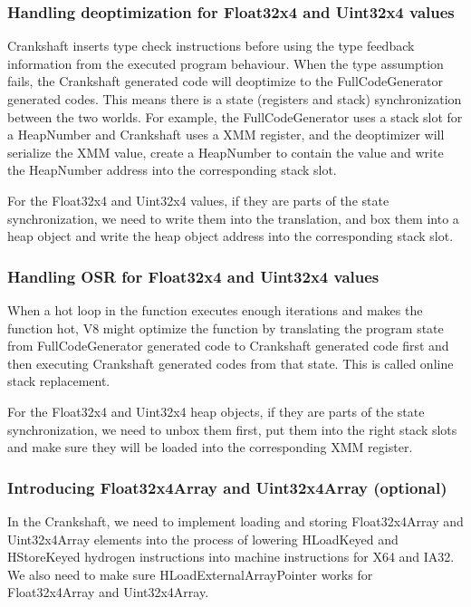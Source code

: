 \documentclass[12pt]{article} %
\begin{document}
\subsubsection{Handling deoptimization for Float32x4 and Uint32x4 values}
Crankshaft inserts type check instructions before using the type feedback
information from the executed program behaviour. When the type assumption
fails, the Crankshaft generated code will deoptimize to the FullCodeGenerator
generated codes. This means there is a state (registers and stack)
synchronization between the two worlds. For example, the FullCodeGenerator uses
a stack slot for a HeapNumber and Crankshaft uses a XMM register, and the
deoptimizer will serialize the XMM value, create a HeapNumber to contain the
value and write the HeapNumber address into the corresponding stack slot.

For the Float32x4 and Uint32x4 values, if they are parts of the state
synchronization, we need to write them into the translation, and box them into
a heap object and write the heap object address into the corresponding stack
slot.

\subsubsection{Handling OSR for Float32x4 and Uint32x4 values}
When a hot loop in the function executes enough iterations and makes the
function hot, V8 might optimize the function by translating the program state
from FullCodeGenerator generated code to Crankshaft generated code first and
then executing Crankshaft generated codes from that state. This is called
online stack replacement.

For the Float32x4 and Uint32x4 heap objects, if they are parts of the state
synchronization, we need to unbox them first, put them into the right stack
slots and make sure they will be loaded into the corresponding XMM register.

\subsubsection{Introducing Float32x4Array and Uint32x4Array (optional)}
In the Crankshaft, we need to implement loading and storing Float32x4Array and
Uint32x4Array elements into the process of lowering HLoadKeyed and HStoreKeyed
hydrogen instructions into machine instructions for X64 and IA32. We also need
to make sure HLoadExternalArrayPointer works for Float32x4Array and
Uint32x4Array.
\end{document}
